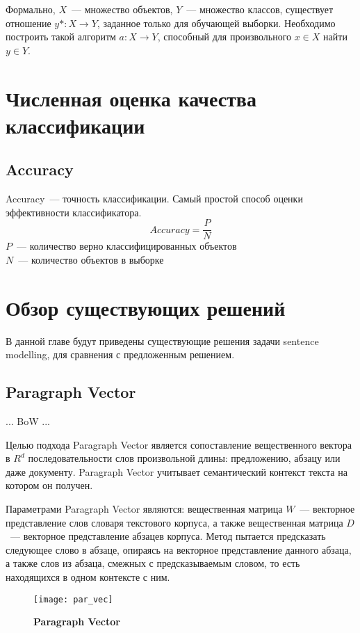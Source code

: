 Формально, $X$~--- множество объектов, $Y$~--- множество классов,
существует отношение $y* : X \rightarrow Y$, заданное только для обучающей выборки.
Необходимо построить такой алгоритм $a: X \rightarrow Y$, способный для произвольного
$x \in X$ найти $y \in Y$.	

\section{Численная оценка качества классификации}

\subsection{Accuracy}
Accuracy~--- точность классификации. Самый простой способ оценки эффективности классификатора.
$$Accuracy =\frac{P}{N}$$
$P$~--- количество верно классифицированных объектов\\
$N$~--- количество объектов в выборке

\section{Обзор существующих решений}

В данной главе будут приведены существующие решения задачи sentence modelling, для сравнения с предложенным решением.


\subsection{Paragraph Vector}

... BoW ...

Целью подхода Paragraph Vector является сопоставление вещественного вектора в $R^d$ последовательности слов произвольной длины: предложению, абзацу или даже документу.
Paragraph Vector учитывает семантический контекст текста на котором он получен.

Параметрами Paragraph Vector являются: вещественная матрица $W$~--- векторное представление слов словаря текстового корпуса, а также вещественная матрица $D$~--- векторное представление абзацев корпуса. Метод пытается предсказать следующее слово в абзаце, опираясь на векторное представление данного абзаца, а также слов из абзаца, смежных с предсказываемым словом, то есть находящихся в одном контексте с ним.

\begin{figure}[h]
\texttt{[image: par\_vec]}
\caption{\textbf{Paragraph Vector}}
\label{fig:par_vec}
\end{figure}


